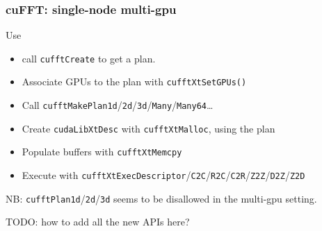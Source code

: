 \documentclass[10pt,aspectratio=169]{beamer}
\begin{document}
\begin{frame}[fragile]
  \frametitle{cuFFT: single-node multi-gpu}

  \begin{center}Use\end{center}

    \bigskip

    \begin{itemize}
    \item call \lstinline{cufftCreate} to get a plan.
    \item Associate GPUs to the plan with \lstinline{cufftXtSetGPUs()}
    \item Call \lstinline{cufftMakePlan1d}/\lstinline{2d}/\lstinline{3d}/\lstinline{Many}/\lstinline{Many64}\dots{}
    \item Create \lstinline{cudaLibXtDesc} with \lstinline{cufftXtMalloc}, using the plan
    \item Populate buffers with \lstinline{cufftXtMemcpy}
    \item Execute with \lstinline{cufftXtExecDescriptor}/\lstinline{C2C}/\lstinline{R2C}/\lstinline{C2R}/\lstinline{Z2Z}/\lstinline{D2Z}/\lstinline{Z2D}
    \end{itemize}

    \bigskip

    NB: \lstinline{cufftPlan1d}/\lstinline{2d}/\lstinline{3d} seems to
    be disallowed in the multi-gpu setting.
    
    \begin{center}TODO: how to add all the new APIs here?\end{center}
      
\end{frame}
\end{document}
